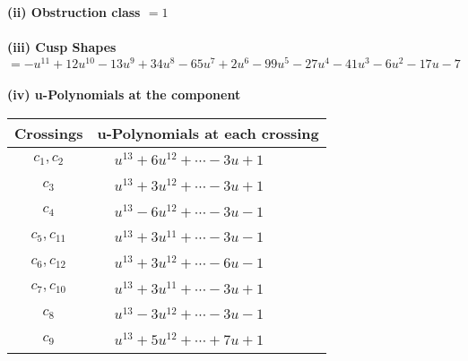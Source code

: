\documentclass[1p]{elsarticle_modified}
\theoremstyle{definition}
\begin{document}
\flushleft \textbf{(ii) Obstruction class $= 1$}\\~\\
\flushleft \textbf{(iii) Cusp Shapes $= - u^{11}+12 u^{10}-13 u^9+34 u^8-65 u^7+2 u^6-99 u^5-27 u^4-41 u^3-6 u^2-17 u-7$}\\~\\
\newpage\renewcommand{\arraystretch}{1}
\flushleft \textbf{(iv) u-Polynomials at the component}\newline \\
\begin{tabular}{m{50pt}|m{274pt}}
Crossings & \hspace{64pt}u-Polynomials at each crossing \\
\hline $$\begin{aligned}c_{1},c_{2}\end{aligned}$$&$\begin{aligned}
&u^{13}+6 u^{12}+\cdots-3 u+1
\end{aligned}$\\
\hline $$\begin{aligned}c_{3}\end{aligned}$$&$\begin{aligned}
&u^{13}+3 u^{12}+\cdots-3 u+1
\end{aligned}$\\
\hline $$\begin{aligned}c_{4}\end{aligned}$$&$\begin{aligned}
&u^{13}-6 u^{12}+\cdots-3 u-1
\end{aligned}$\\
\hline $$\begin{aligned}c_{5},c_{11}\end{aligned}$$&$\begin{aligned}
&u^{13}+3 u^{11}+\cdots-3 u-1
\end{aligned}$\\
\hline $$\begin{aligned}c_{6},c_{12}\end{aligned}$$&$\begin{aligned}
&u^{13}+3 u^{12}+\cdots-6 u-1
\end{aligned}$\\
\hline $$\begin{aligned}c_{7},c_{10}\end{aligned}$$&$\begin{aligned}
&u^{13}+3 u^{11}+\cdots-3 u+1
\end{aligned}$\\
\hline $$\begin{aligned}c_{8}\end{aligned}$$&$\begin{aligned}
&u^{13}-3 u^{12}+\cdots-3 u-1
\end{aligned}$\\
\hline $$\begin{aligned}c_{9}\end{aligned}$$&$\begin{aligned}
&u^{13}+5 u^{12}+\cdots+7 u+1
\end{aligned}$\\
\hline
\end{tabular}\\~\\
\end{document}
